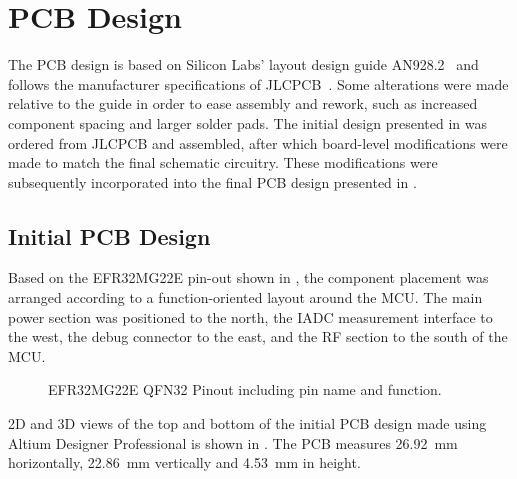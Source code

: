 \section{PCB Design}
The PCB design is based on Silicon Labs' layout design guide AN928.2~\cite{Layout_guide} and follows the manufacturer specifications of JLCPCB~\cite{jlcpcb_capabilities}. Some alterations were made relative to the guide in order to ease assembly and rework, such as increased component spacing and larger solder pads. The initial design presented in  was ordered from JLCPCB and assembled, after which board-level modifications were made to match the final schematic circuitry. These modifications were subsequently incorporated into the final PCB design presented in .

\subsection{Initial PCB Design} \label{sec:Initial_PCB}
Based on the EFR32MG22E pin-out shown in , the component placement was arranged according to a function-oriented layout around the MCU. The main power section was positioned to the north, the IADC measurement interface to the west, the debug connector to the east, and the RF section to the south of the MCU.

\begin{figure}
\centering

    \caption{EFR32MG22E QFN32 Pinout including pin name and function.}
    \label{fig:MCU_pin}
\end{figure}

2D and 3D views of the top and bottom of the initial PCB design made using Altium Designer Professional is shown in . The PCB measures \SI{26.92}{\milli\meter} horizontally, \SI{22.86}{\milli\meter} vertically and \SI{4.53}{\milli\meter} in height.

